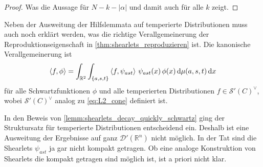 \begin{proof}
    Was die Aussage für $N-k-|\alpha|$ und damit auch für alle $k$ zeigt.
\end{proof}

Neben der Ausweitung der Hilfslemmata auf temperierte Distributionen muss auch noch erklärt werden, was die richtige Verallgemeinerung der Reproduktionseigenschaft in \cref{thm:shearlets_reproduzieren} ist. Die kanonische Verallgemeinerung ist
\begin{equation*}
    \left\langle f,\phi\right\rangle = \int_{\mathbb{R}^2} \int_{\{a,s,t\}}
    \left\langle f,\psi_{ast}\right\rangle\, \psi_{ast}(x) \,\phi(x)
    \mathop{}\!\mathrm{d} \mu(a,s,t) \mathop{}\!\mathrm{d} x
\end{equation*}
für alle Schwartzfunktionen $\phi$ und alle temperierten Distributionen $f \in \mathcal{S}'(C)^\vee$, wobei $\mathcal{S}'(C)^\vee$ analog zu \cref{eq:L2_cone} definiert ist.


In den Beweis von \cref{lemm:shearlets_decay_quickly_schwartz} ging der Struktursatz für temperierte Distributionen entscheidend ein. Deshalb ist eine Ausweitung der Ergebnisse auf ganz $\mathcal{D}'(\mathbb{R}^n)$ nicht möglich. In der Tat sind die Shearlets $\psi_{ast}$ ja gar nicht kompakt getragen.
Ob eine analoge Konstruktion von Shearlets die kompakt getragen sind möglich ist, ist a priori nicht klar.


